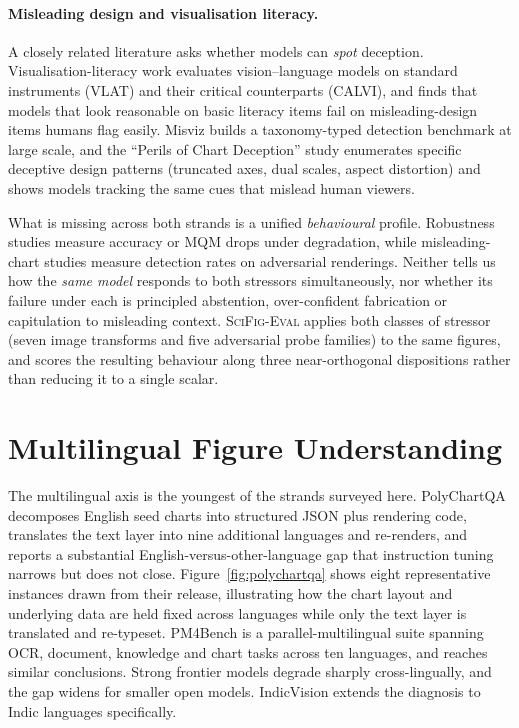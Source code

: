\paragraph{Misleading design and visualisation literacy.} A closely
related literature asks whether models can \emph{spot} deception.
Visualisation-literacy work \citep{pandey2025calvi} evaluates
vision--language models on standard instruments (VLAT) and their
critical counterparts (CALVI), and finds that models that look
reasonable on basic literacy items fail on misleading-design items
humans flag easily. Misviz \citep{tonglet2025misviz} builds a
taxonomy-typed detection benchmark at large scale, and the ``Perils
of Chart Deception'' study \citep{chartdeception2025} enumerates
specific deceptive design patterns (truncated axes, dual scales,
aspect distortion) and shows models tracking the same cues that
mislead human viewers.

What is missing across both strands is a unified \emph{behavioural}
profile. Robustness studies measure accuracy or MQM drops under
degradation, while misleading-chart studies measure detection rates
on adversarial renderings. Neither tells us how the \emph{same model}
responds to both stressors simultaneously, nor whether its failure
under each is principled abstention, over-confident fabrication or
capitulation to misleading context. \textsc{SciFig-Eval} applies
both classes of stressor (seven image transforms and five
adversarial probe families) to the same figures, and scores the
resulting behaviour along three near-orthogonal dispositions rather
than reducing it to a single scalar.

\section{Multilingual Figure Understanding}
\label{sec:lit-multiling}

The multilingual axis is the youngest of the strands surveyed here.
PolyChartQA \citep{li2025polychart} decomposes English seed charts
into structured JSON plus rendering code, translates the text layer
into nine additional languages and re-renders, and reports a
substantial English-versus-other-language gap that instruction
tuning narrows but does not close. Figure~\ref{fig:polychartqa}
shows eight representative instances drawn from their release,
illustrating how the chart layout and underlying data are held
fixed across languages while only the text layer is translated and
re-typeset. PM4Bench
\citep{gao2025pm4bench} is a parallel-multilingual suite spanning
OCR, document, knowledge and chart tasks across ten languages, and
reaches similar conclusions. Strong frontier models degrade sharply
cross-lingually, and the gap widens for smaller open models.
IndicVision \citep{sharma2025indicvision} extends the diagnosis to
Indic languages specifically.

